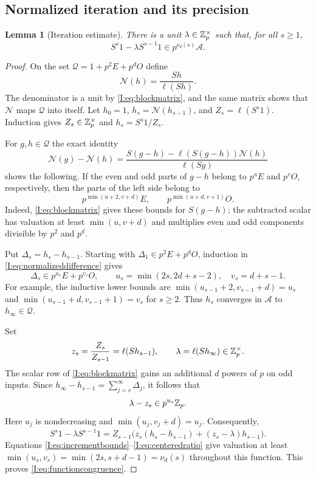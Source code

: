 \documentclass[11pt,letterpaper]{article}
\newtheorem{lemma}[theorem]{Lemma}
\theoremstyle{definition}
\theoremstyle{remark}
\begin{document}
\subsection{Normalized iteration and its precision}

\begin{lemma}[Iteration estimate]\label{I:lem:iteration}
There is a unit $\lambda\in\mathbb Z_p^\times$ such that, for all $s\ge1$,
\begin{equation}\label{I:eq:functioncongruence}
 S^s1-\lambda S^{s-1}1\in p^{\nu_d(s)}\mathcal A.
\end{equation}
\end{lemma}
\begin{proof}
On the set $\mathcal Q=1+p^2E+p^dO$ define
\[
 \mathcal N(h)=\frac{Sh}{\ell(Sh)}.
\]
The denominator is a unit by \eqref{I:eq:blockmatrix}, and the same
matrix shows that $\mathcal N$ maps $\mathcal Q$ into itself.
Let $h_0=1$, $h_s=\mathcal N(h_{s-1})$, and
$Z_s=\ell(S^s1)$.  Induction gives $Z_s\in\mathbb Z_p^\times$ and
$h_s=S^s1/Z_s$.

For $g,h\in\mathcal Q$ the exact identity
\begin{equation}\label{I:eq:normalizeddifference}
 \mathcal N(g)-\mathcal N(h)
 =\frac{S(g-h)-\ell(S(g-h))\mathcal N(h)}{\ell(Sg)}
\end{equation}
shows the following.  If the even and odd parts of $g-h$ belong to
$p^uE$ and $p^vO$, respectively, then the parts of the left side belong
to
\[
 p^{\min(u+2,v+d)}E,
 \qquad p^{\min(u+d,v+1)}O.
\]
Indeed, \eqref{I:eq:blockmatrix} gives these bounds for $S(g-h)$;
the subtracted scalar has valuation at least $\min(u,v+d)$ and
multiplies even and odd components divisible by $p^2$ and $p^d$.

Put $\Delta_s=h_s-h_{s-1}$.  Starting with
$\Delta_1\in p^2E+p^dO$, induction in
\eqref{I:eq:normalizeddifference} gives
\begin{equation}\label{I:eq:incrementbounds}
 \Delta_s\in p^{u_s}E+p^{v_s}O,
 \qquad
 u_s=\min(2s,2d+s-2),\quad v_s=d+s-1.
\end{equation}
For example, the inductive lower bounds are
$\min(u_{s-1}+2,v_{s-1}+d)=u_s$ and
$\min(u_{s-1}+d,v_{s-1}+1)=v_s$ for $s\ge2$.
Thus $h_s$ converges in $\mathcal A$ to $h_\infty\in\mathcal Q$.

Set
\[
 z_s=\frac{Z_s}{Z_{s-1}}=\ell(Sh_{s-1}),
 \qquad \lambda=\ell(Sh_\infty)\in\mathbb Z_p^\times.
\]
The scalar row of \eqref{I:eq:blockmatrix} gains an additional $d$
powers of $p$ on odd inputs.  Since
$h_\infty-h_{s-1}=\sum_{j=s}^{\infty}\Delta_j$, it follows that
\begin{equation}\label{I:eq:centeredratio}
 \lambda-z_s\in p^{u_s}\mathbb Z_p.
\end{equation}
Here $u_j$ is nondecreasing and
$\min(u_j,v_j+d)=u_j$.
Consequently,
\[
 S^s1-\lambda S^{s-1}1
 =Z_{s-1}\bigl(z_s(h_s-h_{s-1})+(z_s-\lambda)h_{s-1}\bigr).
\]
Equations \eqref{I:eq:incrementbounds}--\eqref{I:eq:centeredratio}
give valuation at least
$\min(u_s,v_s)=\min(2s,s+d-1)=\nu_d(s)$ throughout this function.
This proves \eqref{I:eq:functioncongruence}.
\end{proof}
\end{document}
